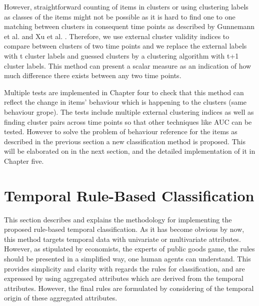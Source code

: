 However, straightforward counting of items in clusters or using clustering labels as classes of the items might not be possible as it is hard to find one to one matching between clusters in consequent time points as described by Gunnemann et al. \cite{Gunnemann2011} and Xu et al. \cite{Xu2013}. Therefore, we use external cluster validity indices to compare between clusters of two time points and we replace the external labels with t cluster labels and guessed clusters by a clustering algorithm with t+1 cluster labels. This method can present a scalar measure as an indication of how much difference there exists between any two time points.

Multiple tests are implemented in Chapter four to check that this method can reflect the change in items' behaviour which is happening to the clusters (same behaviour grope). The tests include multiple external clustering indices as well as finding cluster pairs across time points so that other techniques like AUC can be tested. However to solve the problem of behaviour reference for the items as described in the previous section a new classification method is proposed. This will be elaborated on in the next section, and the detailed implementation of it in Chapter five.

 


\section{Temporal Rule-Based Classification}
\label{sec:Temporal-Rule-Based-Classification}
This section describes and explains the methodology for implementing the proposed rule-based temporal classification. As it has become obvious by now, this method targets temporal data with univariate or multivariate attributes. However, as stipulated by economists, the experts of public goods game, the rules should be presented in a simplified way, one human agents can understand. This provides simplicity and clarity with regards the rules for classification, and are expressed by using aggregated attributes which are derived from the temporal attributes. However, the final rules are formulated by considering of the temporal origin of these aggregated attributes.

